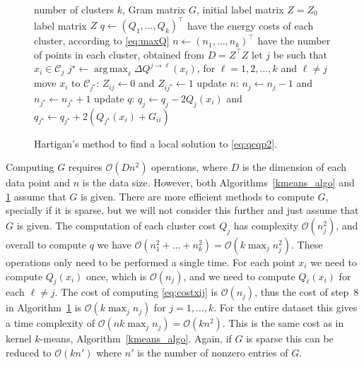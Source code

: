 \documentclass[aps,preprint,nofootinbib,floatfix]{revtex4-1}
\DeclareMathOperator*{\argmax}{arg\,max}
\newcommand\C{{\mathcal{C}}}
\newcommand\OO{{\mathcal{O}}}
\begin{document}
\begin{figure}
\begin{algorithm}[H]
\vspace{.5em}
\begin{algorithmic}[1]
    \INPUT number of clusters $k$, Gram matrix $G$, 
                initial label matrix $Z=Z_0$
    \OUTPUT label matrix $Z$
  \STATE $q \leftarrow (Q_1, \dotsc, Q_k)^\top$ 
            have the energy costs of each cluster, according to \eqref{eq:maxQ}
  \STATE $n \leftarrow (n_1,\dotsc,n_k)^\top$ have the number of points 
        in each cluster, obtained from $D=Z^\top Z$
  \REPEAT
        \STATE let $j$ be such that $x_i \in \C_j$
        \STATE $j^\star \leftarrow \argmax_{\ell} \Delta Q^{j\to \ell}(x_i)$, 
            for $\ell=1,2,\dots,k$ and $\ell \ne j$ \label{stepmove}
            \STATE move $x_i$ to $\C_{j^\star}$: $Z_{ij} \leftarrow 0$ and 
            $Z_{ij^\star} \leftarrow 1$
            \STATE update $n$: $n_j \leftarrow n_j - 1$ and
                    $n_{j^\star} \leftarrow n_{j^\star} + 1$
            \STATE update $q$: $q_j \leftarrow q_j - 2Q_j(x_i)$ and
    $q_{j^\star} \leftarrow q_{j^\star} + 2\left(Q_{j^\star}(x_i)+
    G_{ii}\right)$
        \ENDIF
    \ENDFOR
\end{algorithmic}
\caption{\label{algo}
Hartigan's method to find a local solution to \eqref{eq:qcqp2}.
\hspace{\fill}
}
\end{algorithm}
\end{figure}

Computing $G$ requires $\OO( D n^2)$ operations, where 
$D$ is the dimension of each data point and $n$ is the data size. However,
both Algorithms~\ref{kmeans_algo} and \ref{algo} 
assume that $G$ is given. There are more efficient
methods to compute $G$, specially if it is sparse, but we will not consider
this further and just assume that $G$ is given.
The computation of each cluster cost
$Q_j$ has complexity $\OO(n_j^2)$, and overall to compute $q$
we have $\OO(n_1^2+\dots + n_k^2) = \OO(k \max_j n_j^2)$. 
These operations only need to be performed a single time. For
each point $x_i$ we need to compute $Q_j(x_i)$ once, which is
$\OO(n_j)$, and we need to compute $Q_\ell(x_i)$ for each $\ell\ne j$. 
The cost of computing 
\eqref{eq:costxij} is $\OO(n_j)$, thus the cost of step~$8$ in
Algorithm~\ref{algo} is $\OO(k \max_j n_j)$ for $j=1,\dotsc,k$.
For the 
entire dataset this gives a time complexity
of $\OO(n k  \max_j n_j) =\OO(k n^2)$. This is the same cost as
in kernel $k$-means, Algorithm~\ref{kmeans_algo}. Again, if $G$ is sparse
this can be reduced to $\OO(k n')$ where $n'$ is the number of nonzero
entries of $G$.
\end{document}
